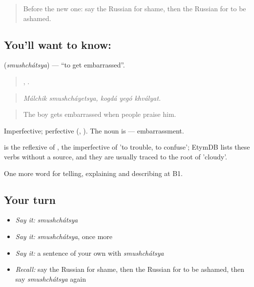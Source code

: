 \begin{quote}
Before the new one: say the Russian for shame, then the Russian for to be ashamed.
\end{quote}

\subsection*{You'll want to know: }
\textbf{} (\emph{smushchátsya}) — \textquotedblleft{}to get embarrassed\textquotedblright{}.

\begin{quote}
 ,   .
\end{quote}

\begin{quote}
\emph{Málchik smushcháyetsya, kogdá yegó khvályat.}
\end{quote}

\begin{quote}
The boy gets embarrassed when people praise him.
\end{quote}

Imperfective; perfective  (, ). The noun is  — embarrassment.

\begin{cousinweb}
\emph{} is the reflexive of \emph{}, the imperfective of \emph{} 'to trouble, to confuse'; EtymDB lists these verbs without a source, and they are usually traced to the root of \emph{} 'cloudy'.
\end{cousinweb}

\begin{grammarlens}[title={What you've built}]
One more word for telling, explaining and describing at B1.
\end{grammarlens}

\subsection*{Your turn}
\begin{itemize}
\raggedright
  \item \emph{Say it:} \emph{smushchátsya}
  \item \emph{Say it:} \emph{smushchátsya}, once more
  \item \emph{Say it:} a sentence of your own with \emph{smushchátsya}
  \item \emph{Recall:} say the Russian for shame, then the Russian for to be ashamed, then say \emph{smushchátsya} again
\end{itemize}

